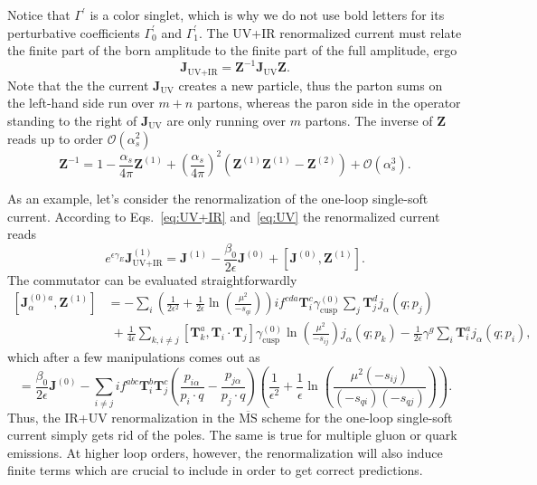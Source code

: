 \documentclass[a4paper,11pt]{article}
\begin{document}
Notice that $\Gamma^\prime$ is a color singlet, which is why we do not use bold letters for its perturbative coefficients $\Gamma_0^\prime$ and $\Gamma_1^\prime$. The UV+IR renormalized current must relate the finite part of the born amplitude to the finite part of the full amplitude, ergo
\begin{equation}
\mathbf{J}_{\text{UV+IR}} = \mathbf{Z}^{-1} \mathbf{J}_{\text{UV}} \mathbf{Z}.
\label{eq:UV+IR}
\end{equation}
Note that the the current $\mathbf{J}_{\text{UV}}$ creates a new particle, thus the parton sums on the left-hand side run over $m + n$ partons, whereas the paron side in the operator standing to the right of $\mathbf{J}_{\text{UV}}$ are only running over $m$ partons.
The inverse of $\mathbf{Z}$ reads up to order $\mathcal{O}(\alpha_s^2)$
\begin{equation}
\mathbf{Z}^{-1} = 1 - \frac{\alpha_s}{4 \pi} \mathbf{Z}^{(1)} + \left( \frac{\alpha_s}{4 \pi} \right)^2 \left(\mathbf{Z}^{(1)} \mathbf{Z}^{(1)} - \mathbf{Z}^{(2)} \right) + \mathcal{O} (\alpha_s^3).
\end{equation}

As an example, let's consider the renormalization of the one-loop single-soft current. According to Eqs.~\eqref{eq:UV+IR} and\ \eqref{eq:UV} the renormalized current reads
\begin{equation}
e^{\epsilon \gamma_E} \mathbf{J}_{\text{UV+IR}}^{(1)} = \mathbf{J}^{(1)} - \frac{\beta_0}{2 \epsilon} \mathbf{J}^{(0)} + [\mathbf{J}^{(0)}, \mathbf{Z}^{(1)}].
\end{equation}
The commutator can be evaluated straightforwardly
\begin{equation}
\begin{split}
[\mathbf{J}^{(0)a}_\alpha, \mathbf{Z}^{(1)}] &= - \sum_i \left(\frac{1}{2 \epsilon^2} + \frac{1}{2 \epsilon} \ln\!\left(\frac{\mu^2}{-s_{qi}} \right) \right) i f^{cda} \mathbf{T}_i^{c} \gamma_\text{cusp}^{(0)} \sum_j \mathbf{T}_j^d j_\alpha(q; p_j) \\
&\; + \frac{1}{4 \epsilon} \sum_{k, i\neq j} [\mathbf{T}_k^a, \mathbf{T}_i \cdot \mathbf{T}_j] \gamma_\text{cusp}^{(0)} \ln\!\left(\frac{\mu^2}{-s_{ij}} \right) j_\alpha (q; p_k) - \frac{1}{2 \epsilon} \gamma^g \sum_i \mathbf{T}_i^a j_\alpha (q; p_i),
\end{split}
\end{equation}
which after a few manipulations comes out as
\begin{equation}
    [\mathbf{J}^{(0)a}_\alpha, \mathbf{Z}^{(1)}] = \frac{\beta_0}{2 \epsilon} \mathbf{J}^{(0)} - \sum_{i \neq j} i f^{abc} \mathbf{T}_i^b \mathbf{T}_j^c \left(\frac{p_{i\alpha}}{p_i \cdot q} - \frac{p_{j \alpha}}{p_j \cdot q} \right) \left(\frac{1}{\epsilon^2} + \frac{1}{\epsilon} \ln\!\left(\frac{\mu^2 (-s_{ij})}{(-s_{qi}) (-s_{qj})} \right) \right).
\end{equation}
Thus, the IR+UV renormalization in the $\overline{\text{MS}}$ scheme for the one-loop single-soft current simply gets rid of the poles. The same is true for multiple gluon or quark emissions. At higher loop orders, however, the renormalization will also induce finite terms which are crucial to include in order to get correct predictions.
\end{document}
